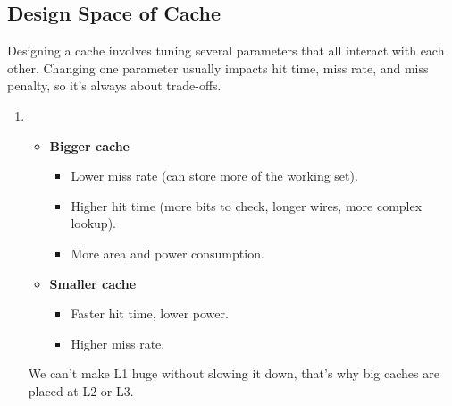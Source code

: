 \subsection{Design Space of Cache}

Designing a cache involves tuning several parameters that all interact with each other. Changing one parameter usually impacts hit time, miss rate, and miss penalty, so it's always about trade-offs.
\begin{enumerate}
    \item {}
    \begin{itemize}
        \item \textbf{Bigger cache}
        \begin{itemize}
            \item[\textcolor{Green3}{\faIcon{check}}] Lower miss rate (can store more of the working set).
            \item[\textcolor{Red2}{\faIcon{times}}] Higher hit time (more bits to check, longer wires, more complex lookup).
            \item[\textcolor{Red2}{\faIcon{times}}] More area and power consumption.
        \end{itemize}
        \item \textbf{Smaller cache}
        \begin{itemize}
            \item[\textcolor{Green3}{\faIcon{check}}] Faster hit time, lower power.
            \item[\textcolor{Red2}{\faIcon{times}}] Higher miss rate.
        \end{itemize}
    \end{itemize}
    We can't make L1 huge without slowing it down, that's why big caches are placed at L2 or L3.
    

\end{enumerate}
